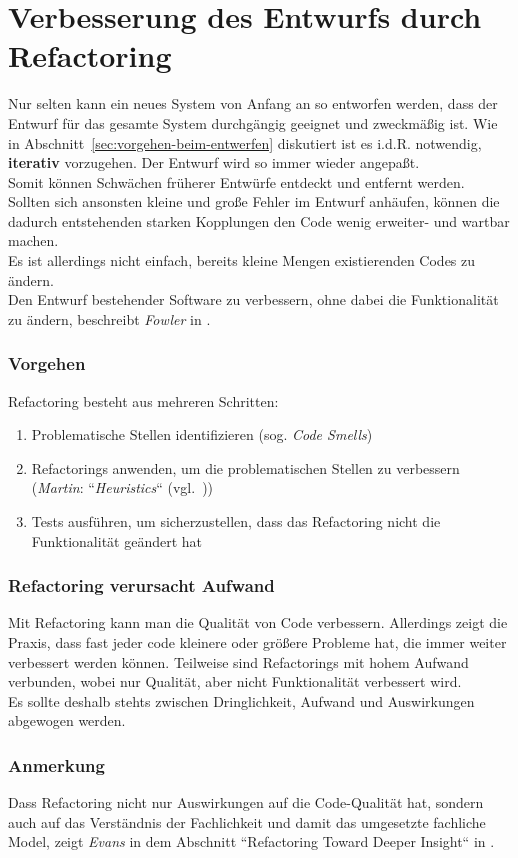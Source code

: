 \section{Verbesserung des Entwurfs durch Refactoring}
Nur selten kann ein neues System von Anfang an so entworfen werden, dass der Entwurf für das gesamte System  durchgängig geeignet und zweckmäßig ist.
Wie in Abschnitt~\ref{sec:vorgehen-beim-entwerfen} diskutiert ist es i.d.R. notwendig, \textbf{iterativ} vorzugehen.
Der Entwurf wird so immer wieder angepaßt.\\
Somit können Schwächen früherer Entwürfe entdeckt und entfernt werden.\\
Sollten sich ansonsten kleine und große Fehler im Entwurf anhäufen, können die dadurch entstehenden starken Kopplungen den Code wenig erweiter- und wartbar machen.\\

\noindent
Es ist allerdings nicht einfach, bereits kleine Mengen existierenden Codes zu ändern.\\
Den Entwurf bestehender Software zu verbessern, ohne dabei die Funktionalität zu ändern, beschreibt \textit{Fowler} in \cite{Fow99}.

\subsubsection*{Vorgehen}
Refactoring besteht aus mehreren Schritten:

\begin{enumerate}
    \item Problematische Stellen identifizieren (sog. \textit{Code Smells})
    \item Refactorings anwenden, um die problematischen Stellen zu verbessern (\textit{Martin}: ``\textit{Heuristics}`` (vgl.~\cite[285 ff.]{Mar08}))
    \item Tests ausführen, um sicherzustellen, dass das Refactoring nicht die Funktionalität geändert hat
\end{enumerate}

\subsubsection*{Refactoring verursacht Aufwand}
Mit Refactoring kann man die Qualität von Code verbessern.
Allerdings zeigt die Praxis, dass fast jeder code kleinere oder größere Probleme hat, die immer weiter verbessert werden können.
Teilweise sind Refactorings mit hohem Aufwand verbunden, wobei nur Qualität, aber nicht Funktionalität verbessert wird.\\
Es sollte deshalb stehts zwischen Dringlichkeit, Aufwand und Auswirkungen abgewogen werden.

\subsubsection*{Anmerkung}
Dass Refactoring nicht nur Auswirkungen auf die Code-Qualität hat, sondern auch auf das Verständnis der Fachlichkeit und damit das umgesetzte fachliche Model, zeigt \textit{Evans} in dem Abschnitt ``Refactoring Toward Deeper Insight`` in \cite{Eva03}.